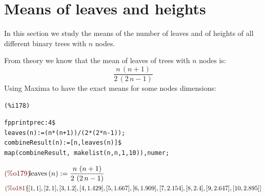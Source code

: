 
\section{Means of leaves and heights}

In this section we study the means of the number of leaves and of
heights of all different binary trees with $n$ nodes.

From theory we know that the mean of leaves of trees with $n$ nodes
is:
\begin{displaymath}
  \frac{n\,\left( n+1\right)  }{2\,\left( 2\,n-1\right) }
\end{displaymath}
Using Maxima to have the exact means for some nodes dimensions:

\noindent
\begin{minipage}[t]{8ex}{\color{red}\bf
\begin{verbatim}
(%i178) 
\end{verbatim}}
\end{minipage}
\begin{minipage}[t]{\textwidth}{\color{blue}
\begin{verbatim}
fpprintprec:4$
leaves(n):=(n*(n+1))/(2*(2*n-1));
combineResult(n):=[n,leaves(n)]$
map(combineResult, makelist(n,n,1,10)),numer;
\end{verbatim}}
\end{minipage}
\begin{math}\displaystyle
\parbox{8ex}{\color{labelcolor}(\%o179) }
\mathrm{leaves}\left( n\right) :=\frac{n\,\left( n+1\right)
}{2\,\left( 2\,n-1\right) }
\end{math}\\
\begin{math}\displaystyle
\parbox{8ex}{\color{labelcolor}(\%o181) }
[[1,1],[2,1],[3,1.2],[4,1.429],[5,1.667],[6,1.909],[7,2.154],[8,2.4],
[9,2.647],[10,2.895]]
\end{math}\\


